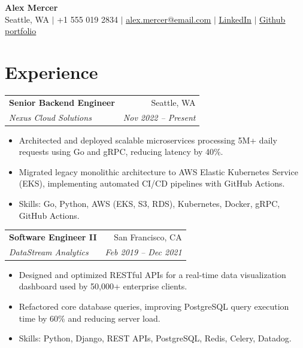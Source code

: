 \documentclass[10pt,letterpaper]{article}
\makeatletter
\newcommand{\raleway}{\fontfamily{Raleway-TLF}\selectfont}
\newcommand{\entry}[4]{%
  \begin{tabularx}{\linewidth}{@{}X r@{}}
    \textbf{#1} & #2 \\
    \textit{#3} & \textit{#4} \\
  \end{tabularx}%
}
\makeatother
\begin{document}
\color{softblack}

\begin{center}
  {\LARGE\raleway\bfseries Alex Mercer}\\[6pt]
  Seattle, WA \enspace $|$ \enspace +1 555 019 2834 \enspace $|$ \enspace
  \href{mailto:alex.mercer@email.com}{\underline{alex.mercer@email.com}} \enspace $|$ \enspace
  \href{https://linkedin.com/in/alexmercer-dev}
  {\underline{LinkedIn}} \enspace $|$ \enspace
  \href{https://github.com/ale654789302mercer-dev}
  {\underline{Github portfolio}}
\end{center}

\section{Experience}

\entry{Senior Backend Engineer}{Seattle, WA}
      {Nexus Cloud Solutions}{Nov 2022 -- Present}
\begin{itemize}
  \item Architected and deployed scalable microservices processing 5M+ daily requests using Go and gRPC, reducing latency by 40\%.
  \item Migrated legacy monolithic architecture to AWS Elastic Kubernetes Service (EKS), implementing automated CI/CD pipelines with GitHub Actions.
  \item Skills: Go, Python, AWS (EKS, S3, RDS), Kubernetes, Docker, gRPC, GitHub Actions.
\end{itemize}

\vspace{4pt}

\entry{Software Engineer II}{San Francisco, CA}
      {DataStream Analytics}{Feb 2019 -- Dec 2021}
\begin{itemize}
  \item Designed and optimized RESTful APIs for a real-time data visualization dashboard used by 50,000+ enterprise clients.
  \item Refactored core database queries, improving PostgreSQL query execution time by 60\% and reducing server load.
  \item Skills: Python, Django, REST APIs, PostgreSQL, Redis, Celery, Datadog.
\end{itemize}

\vspace{4pt}
\end{document}
